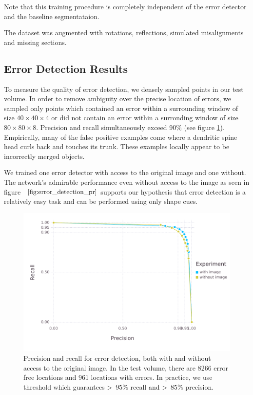 \documentclass{article}
\begin{document}
Note that this training procedure is completely independent of the error detector and the baseline segmentataion.

The dataset was augmented with rotations, reflections, simulated misalignments and missing sections.

\subsection{Error Detection Results}
To measure the quality of error detection, we densely sampled points in our test volume. In order to remove ambiguity over the precise location of errors, we sampled only points which contained an error within a surrounding window of size $40\times 40 \times 4$ or did not contain an error within a surronding window of size $80 \times 80 \times 8$. Precision and recall simultaneously exceed 90\% (see figure \ref{fig:error_detection_pr}). Empirically, many of the false positive examples come where a dendritic spine head curls back and touches its trunk. These examples locally appear to be incorrectly merged objects.

We trained one error detector with access to the original image and one without. The network's admirable performance even without access to the image as seen in figure ~$\ref{fig:error_detection_pr}$ supports our hypothesis that error detection is a relatively easy task and can be performed using only shape cues.
\begin{figure}
\begin{center}
	\includegraphics[width=0.65\linewidth]{pr.pdf}
	\caption{Precision and recall for error detection, both with and without access to the original image. In the test volume, there are 8266 error free locations and 961 locations with errors. In practice, we use threshold which guarantees >~95\% recall and >~85\% precision.}
	\label{fig:error_detection_pr}
\end{center}
\end{figure}
\end{document}
